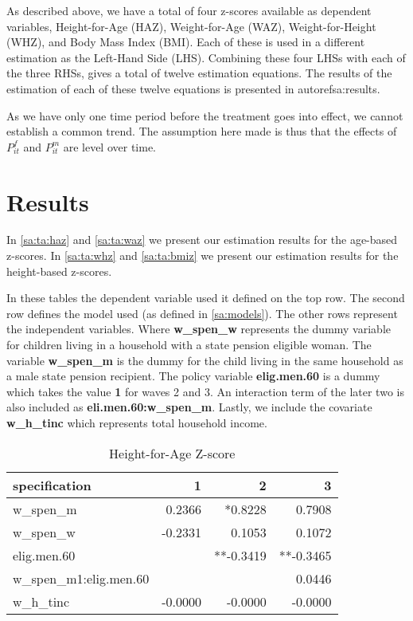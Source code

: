 \begin{refsection}
As described above, we have a total of four z-scores available as dependent variables, Height-for-Age (HAZ), Weight-for-Age (WAZ), Weight-for-Height (WHZ), and Body Mass Index (BMI). Each of these is used in a different estimation as the Left-Hand Side (LHS).
Combining these four LHSs with each of the three RHSs, gives a total of twelve estimation equations.
The results of the estimation of each of these twelve equations is presented in autoref{sa:results}.

As we have only one time period before the treatment goes into effect,
we cannot establish a common trend.
The assumption here made is thus that the effects of $P^f_{it}$ and $P^m_{it}$ are level over time.


\section{Results}
\label{sa:results}
In \autoref{sa:ta:haz} and \autoref{sa:ta:waz} we present our estimation results for the age-based z-scores.
In \autoref{sa:ta:whz} and \autoref{sa:ta:bmiz} we present our estimation results for the height-based z-scores.

In these tables the dependent variable used it defined on the top row.
The second row defines the model used (as defined in \autoref{sa:models}).
The other rows represent the independent variables.
Where \textbf{w\_spen\_w} represents the dummy variable for children living in a household with a state pension eligible woman.
The variable \textbf{w\_spen\_m} is the dummy for the child living in the same household as a male state pension recipient.
The policy variable \textbf{elig.men.60} is a dummy which takes the value \textbf{1} for waves 2 and 3.
An interaction term of the later two is also included as \textbf{eli.men.60:w\_spen\_m}.
Lastly, we include the covariate \textbf{w\_h\_tinc} which represents total household income.

\begin{table}[!ht]
\centering
\caption{Height-for-Age Z-score}
\label{sa:ta:haz}
\begin{tabular}{l|rrr}
\hline
specification & 1 & 2 & 3\\
\hline
w\_spen\_m & 0.2366 & *0.8228 & 0.7908 \\
w\_spen\_w & -0.2331 & 0.1053 & 0.1072 \\
elig.men.60 & & **-0.3419 & **-0.3465 \\
w\_spen\_m1:elig.men.60 & & & 0.0446 \\
w\_h\_tinc & -0.0000 & -0.0000 & -0.0000 \\
\end{tabular}
\end{table}


\end{refsection}

